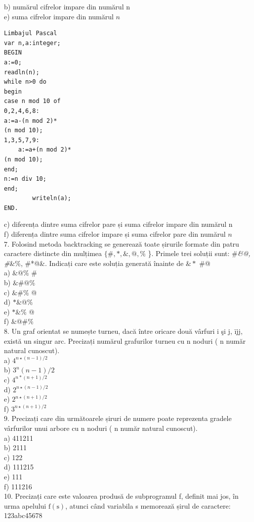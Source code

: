 \documentclass[10pt]{article}
\begin{document}
b) numărul cifrelor impare din numărul n\\
e) suma cifrelor impare din numărul $n$

\begin{verbatim}
Limbajul Pascal
var n,a:integer;
BEGIN
a:=0;
readln(n);
while n>0 do
begin
case n mod 10 of
0,2,4,6,8:
a:=a-(n mod 2)*
(n mod 10);
1,3,5,7,9:
    a:=a+(n mod 2)*
(n mod 10);
end;
n:=n div 10;
end;
        writeln(a);
END.
\end{verbatim}

c) diferența dintre suma cifrelor pare și suma cifrelor impare din numărul n\\
f) diferența dintre suma cifrelor impare și suma cifrelor pare din numărul $n$\\
7. Folosind metoda backtracking se generează toate șirurile formate din patru caractere distincte din mulțimea $\{\#, *, \&, @, \%$ \}. Primele trei soluții sunt: \#\textit{\&@, \#}\&\%, \#*@\&. Indicați care este soluția generată înainte de $\& *$ \#@\\
a) $\& @ \%$ \#\\
b) $\& \# @ \%$\\
c) $\& \# \%$ @\\
d) $* \& @ \%$\\
e) $* \& \%$ @\\
f) $\& @ \# \%$\\
8. Un graf orientat se numește turneu, dacă între oricare două vârfuri i şi j, ījj, există un singur arc. Precizați numărul grafurilor turneu cu n noduri ( n număr natural cunoscut).\\
a) $4^{n \star(n-1) / 2}$\\
b) $3^{n}(n-1) / 2$\\
c) $4^{n *(n+1) / 2}$\\
d) $2^{n \star(n-1) / 2}$\\
e) $2^{n \star(n+1) / 2}$\\
f) $3^{n \star(n+1) / 2}$\\
9. Precizați care din următoarele șiruri de numere poate reprezenta gradele vârfurilor unui arbore cu n noduri ( n număr natural cunoscut).\\
a) 411211\\
b) 2111\\
c) 122\\
d) 111215\\
e) 111\\
f) 111216\\
10. Precizați care este valoarea produsă de subprogramul f, definit mai jos, în urma apelului $\mathrm{f}(\mathrm{s})$, atunci când variabila s memorează șirul de caractere: 123abc45678
\end{document}
